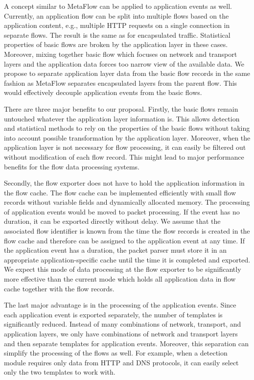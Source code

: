 A concept similar to MetaFlow can be applied to application events as well. Currently, an application flow can be split into multiple flows based on the application content, e.g., multiple HTTP requests on a single connection in separate flows. The result is the same as for encapsulated traffic. Statistical properties of basic flows are broken by the application layer in these cases. Moreover, mixing together basic flow which focuses on network and transport layers and the application data forces too narrow view of the available data. We propose to separate application layer data from the basic flow records in the same fashion as MetaFlow separates encapsulated layers from the parent flow. This would effectively decouple application events from the basic flows.

There are three major benefits to our proposal. Firstly, the basic flows remain untouched whatever the application layer information is. This allows detection and statistical methods to rely on the properties of the basic flows without taking into account possible transformation by the application layer. Moreover, when the application layer is not necessary for flow processing, it can easily be filtered out without modification of each flow record. This might lead to major performance benefits for the flow data processing systems.

Secondly, the flow exporter does not have to hold the application information in the flow cache. The flow cache can be implemented efficiently with small flow records without variable fields and dynamically allocated memory. The processing of application events would be moved to packet processing. If the event has no duration, it can be exported directly without delay. We assume that the associated flow identifier is known from the time the flow records is created in the flow cache and therefore can be assigned to the application event at any time. If the application event has a duration, the packet parser must store it in an appropriate application-specific cache until the time it is completed and exported. We expect this mode of data processing at the flow exporter to be significantly more effective than the current mode which holds all application data in flow cache together with the flow records.

The last major advantage is in the processing of the application events. Since each application event is exported separately, the number of templates is significantly reduced. Instead of many combinations of network, transport, and application layers, we only have combinations of network and transport layers and then separate templates for application events. Moreover, this separation can simplify the processing of the flows as well. For example, when a detection module requires only data from HTTP and DNS protocols, it can easily select only the two templates to work with. 

